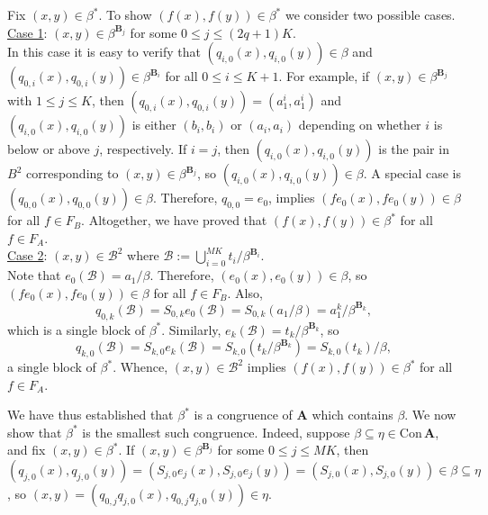 \documentclass[cm,dissertation]{uhthesis}
\theoremstyle{plain}
\theoremstyle{definition}
\theoremstyle{remark}
\numberwithin{theorem}{section}
\numberwithin{claim}{chapter}
\numberwithin{equation}{section}
\numberwithin{conjecture}{chapter}
\newcommand{\<}{\ensuremath{\langle}}
\renewcommand{\>}{\ensuremath{\rangle}}
\renewcommand{\leq}{\ensuremath{\leqslant}}
\newcommand{\Con}{\ensuremath{\mathrm{Con\,}}}
\newcommand{\0}{\ensuremath{\mathbf{0}}}
\newcommand{\1}{\ensuremath{\mathbf{1}}}
\newcommand{\2}{\ensuremath{\mathbf{2}}}
\newcommand{\3}{\ensuremath{\mathbf{3}}}
\newcommand{\4}{\ensuremath{\mathbf{4}}}
\newcommand{\5}{\ensuremath{\mathbf{5}}}
\newcommand{\bA}{\ensuremath{\mathbf{A}}}
\newcommand{\bB}{\ensuremath{\mathbf{B}}}
\newcommand{\sB}{\ensuremath{\mathscr{B}}}
\begin{document}
Fix $(x,y) \in \beta^*$.  To show $(f(x), f(y)) \in \beta^*$ we consider two
possible cases.
\\[6pt]
\underline{Case 1}: $(x,y)\in \beta^{\bB_j}$ for some $0\leq j \leq (2q+1)K$.\\[4pt]
In this case it is easy to verify that $(q_{i,0}(x), q_{i,0}(y)) \in \beta$ and 
$(q_{0,i}(x), q_{0,i}(y)) \in \beta^{\bB_i}$  for all $0\leq i \leq
K+1$.  For example, if $(x,y)\in \beta^{\bB_j}$ with $1\leq j \leq K$, 
then $(q_{0,i}(x), q_{0,i}(y))  = (a_1^i, a_1^i)$ %
and $(q_{i,0}(x), q_{i,0}(y))$ is either $(b_i, b_i)$ or $(a_i,
a_i)$ depending on whether $i$ is below or above $j$, respectively. If $i=j$,
then $(q_{i,0}(x), q_{i,0}(y))$ is the pair in $B^2$ corresponding to
$(x,y)\in \beta^{\bB_j}$, so $(q_{i,0}(x), q_{i,0}(y))\in \beta$.
A special case is $(q_{0,0}(x), q_{0,0}(y)) \in \beta$.  Therefore,
$q_{0,0} = e_0$, implies $(f e_{0}(x), f e_{0}(y))\in \beta$
for all $f\in F_B$.
Altogether, we have proved that $(f(x),f(y))\in \beta^*$
for all $f\in F_A$.
\\[6pt]
\underline{Case 2}: $(x,y)\in \sB^2$ where $\sB := \bigcup_{i=0}^{MK}t_i/\beta^{\bB_i}$.
\\[4pt]
Note that  $e_0(\sB) = a_1/\beta$. Therefore, 
$(e_0(x),e_0(y)) \in  \beta$, so 
$(fe_0(x),fe_0(y)) \in  \beta$ for all $f\in F_B$.  Also,
\[
q_{0,k}(\sB) = S_{0,k} e_0(\sB) = S_{0,k}(a_1/\beta) = 
a_1^{k}/\beta^{\bB_{k}},
\]
which is a single block of $\beta^*$.
Similarly,
$e_k(\sB) = t_k/\beta^{\bB_k}$, so 
\[
q_{k,0}(\sB) = S_{k,0} e_k(\sB) = S_{k,0}(t_k/\beta^{\bB_k}) = S_{k,0}(t_k)/\beta,
\]
a single block of $\beta^*$.
Whence, $(x,y)\in \sB^2$ implies $(f(x), f(y)) \in \beta^*$ for all $f\in F_A$.

We have thus established that $\beta^*$ is a congruence of $\bA$ which
contains $\beta$.  We now show that $\beta^*$ is the smallest such congruence.  Indeed,
suppose $\beta \subseteq \eta \in \Con\bA$, and fix $(x,y)\in \beta^*$.
If $(x,y)\in \beta^{\bB_j}$ for some $0\leq j \leq MK$, then 
$(q_{j,0}(x), q_{j,0}(y)) = (S_{j,0}e_j(x), S_{j,0}e_j(y))= (S_{j,0}(x), S_{j,0}(y))\in \beta \subseteq \eta$, so 
$(x, y) = (q_{0,j}q_{j,0}(x), q_{0,j}q_{j,0}(y))\in \eta$.
\end{document}
